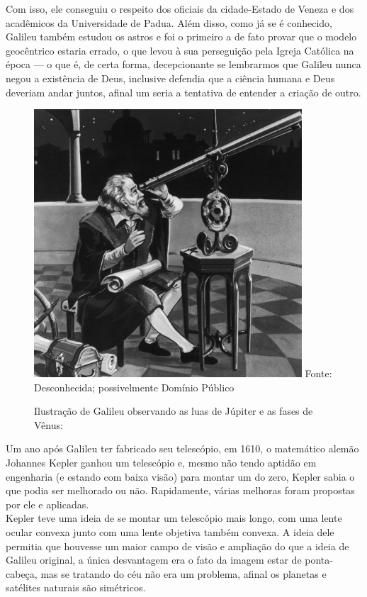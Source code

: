\documentclass[
  a4paper]{article}
\begin{document}
Com isso, ele conseguiu o respeito dos oficiais da cidade-Estado de
Veneza e dos acadêmicos da Universidade de Padua. Além disso, como já se
é conhecido, Galileu também estudou os astros e foi o primeiro a de fato
provar que o modelo geocêntrico estaria errado, o que levou à sua
perseguição pela Igreja Católica na época --- o que é, de certa forma,
decepcionante se lembrarmos que Galileu nunca negou a existência de
Deus, inclusive defendia que a ciência humana e Deus deveriam andar
juntos, afinal um seria a tentativa de entender a criação de outro.

\begin{figure}[!h]
\centering
    \caption{Ilustração de Galileu observando as luas de Júpiter e as fases
de Vênus:} 
    \includegraphics[width=100mm]{../_img/galileo-galilei-discovers-the-moons-of-jupiter-and-the-phase-of-venus.jpg}
    \linebreak
    Fonte: Desconhecida; possivelmente Domínio Público
\end{figure}

\newpage

Um ano após Galileu ter fabricado seu telescópio, em 1610, o matemático
alemão Johannes Kepler ganhou um telescópio e, mesmo não tendo aptidão
em engenharia (e estando com baixa visão) para montar um do zero, Kepler
sabia o que podia ser melhorado ou não. Rapidamente, várias melhoras
foram propostas por ele e aplicadas.\\
Kepler teve uma ideia de se montar um telescópio mais longo, com uma
lente ocular convexa junto com uma lente objetiva também convexa. A
ideia dele permitia que houvesse um maior campo de visão e ampliação do
que a ideia de Galileu original, a única desvantagem era o fato da
imagem estar de ponta-cabeça, mas se tratando do céu não era um
problema, afinal os planetas e satélites naturais são simétricos.
\end{document}
